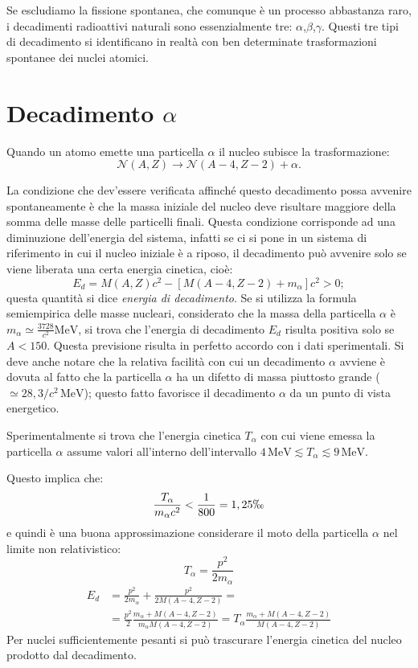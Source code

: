 Se escludiamo la fissione spontanea, che comunque è un processo abbastanza raro, i decadimenti radioattivi naturali sono essenzialmente tre:
$\alpha$,$\beta$,$\gamma$. Questi tre tipi di decadimento si identificano in realtà con ben determinate trasformazioni spontanee dei nuclei atomici.

\section{Decadimento $\alpha$}

Quando un atomo emette una particella $\alpha$ il nucleo subisce la
trasformazione:
\begin{equation}
\mathcal{N}(A,Z)\rightarrow\mathcal{N}(A-4,Z-2)+\alpha.
\end{equation}

La condizione che dev'essere verificata affinché questo decadimento possa
avvenire spontaneamente è che la massa iniziale del nucleo deve risultare
maggiore della somma delle masse delle particelli finali. Questa condizione
corrisponde ad una diminuzione dell'energia del sistema, infatti se ci si pone
in un sistema di riferimento in cui il nucleo iniziale è a riposo, il
decadimento può avvenire solo se viene liberata una certa energia cinetica,
cioè:
\begin{equation}
E_d=M(A,Z)c^2-[M(A-4,Z-2)+m_{\alpha}]c^2>0;
\end{equation}
questa quantità  si dice \textit{energia di decadimento}. Se si utilizza la
formula semiempirica delle masse nucleari, considerato che la massa della
particella $\alpha$ è $m_{\alpha}\simeq\frac{3728}{c^2}\si{\mega\electronvolt}$,
si trova che l'energia di decadimento $E_d$ risulta positiva solo se $A<150$.
Questa previsione risulta in perfetto accordo con i dati sperimentali. Si deve
anche notare che la relativa facilità con cui un decadimento $\alpha$ avviene è
dovuta al fatto che la particella $\alpha$ ha un difetto di massa piuttosto
grande ($\simeq28,3/c^2\,\si{\mega\electronvolt}$); questo fatto favorisce il
decadimento $\alpha$ da un punto di vista energetico.

Sperimentalmente si trova che l'energia cinetica $T_{\alpha}$ con cui viene
emessa la particella $\alpha$ assume valori all'interno dell'intervallo
$4\,\si{\mega\electronvolt}\lesssim T_{\alpha}\lesssim
9\,\si{\mega\electronvolt}$.

Questo implica che:
\[
\frac{T_{\alpha}}{m_{\alpha}c^2}<\frac{1}{800}=1,25\permil
\]
e quindi è una buona approssimazione considerare il moto della particella
$\alpha$ nel limite non relativistico:
\[
T_{\alpha}=\frac{p^2}{2m_{\alpha}}
\]
\begin{equation}
  \begin{split}
  E_d&=\frac{p^2}{2m_{\alpha}}+\frac{p^2}{2M(A-4,Z-2)}=\\
  &=\frac{p^2}{2}\frac{m_{\alpha}+M(A-4,Z-2)}{m_{\alpha}M(A-4,Z-2)}=T_{\alpha}\frac{m_{\alpha}+M(A-4,Z-2)}{M(A-4,Z-2)}
\end{split}
\end{equation}
Per nuclei sufficientemente pesanti si può trascurare l'energia cinetica del
nucleo prodotto dal decadimento.


